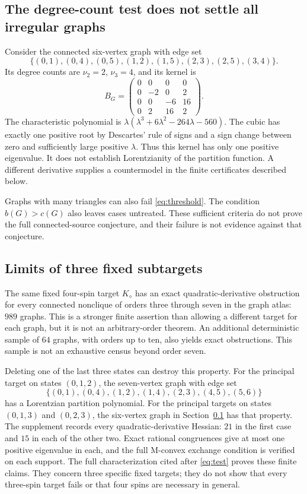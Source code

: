 \documentclass[11pt]{article}
\theoremstyle{remark}
\begin{document}
\subsection{The degree-count test does not settle all irregular graphs}
\label{ex:degreefailure}
Consider the connected six-vertex graph with edge set
\[
 \{(0,1),(0,4),(0,5),(1,2),(1,5),(2,3),(2,5),(3,4)\}.
\]
Its degree counts are $\nu_2=2$, $\nu_3=4$, and its kernel is
\[
 B_G=
 \begin{pmatrix}
 0&0&0&0\\0&-2&0&2\\0&0&-6&16\\0&2&16&2
 \end{pmatrix}.
\]
The characteristic polynomial is
$\lambda(\lambda^3+6\lambda^2-264\lambda-560)$.
The cubic has exactly one positive root by Descartes' rule of signs
and a sign change between zero and sufficiently large positive
$\lambda$. Thus this kernel has only one positive eigenvalue.
It does not establish Lorentzianity of the partition function.
A different derivative supplies a countermodel in the finite
certificates described below.

Graphs with many triangles can also fail
\eqref{eq:threshold}. The condition $b(G)>c(G)$
also leaves cases untreated. These sufficient criteria do not prove
the full connected-source conjecture, and their failure is not evidence
against that conjecture.


\subsection{Limits of three fixed subtargets}
The same fixed four-spin target $K_{\diamond}$ has an exact
quadratic-derivative obstruction for every connected nonclique of
orders three through seven in the graph atlas: $989$ graphs.
This is a stronger finite assertion than allowing a different
target for each graph, but it is not an arbitrary-order theorem.
An additional deterministic sample of $64$ graphs, with orders up
to ten, also yields exact obstructions. This sample is not an
exhaustive census beyond order seven.

Deleting one of the last three states can destroy this property.
For the principal target on states $(0,1,2)$, the seven-vertex graph
with edge set
\[
 \{(0,1),(0,4),(1,2),(1,4),(2,3),(4,5),(5,6)\}
\]
has a Lorentzian partition polynomial. For the principal targets
on states $(0,1,3)$ and $(0,2,3)$, the six-vertex graph in
Section~\ref{ex:degreefailure} has that property. The supplement
records every quadratic-derivative Hessian: $21$ in the first
case and $15$ in each of the other two. Exact rational congruences
give at most one positive eigenvalue in each, and the full M-convex
exchange condition is verified on each support. The full
characterization cited after \eqref{eq:test} proves these finite
claims. They concern three specific fixed targets; they do not
show that every three-spin target fails or that four spins are
necessary in general.
\end{document}
